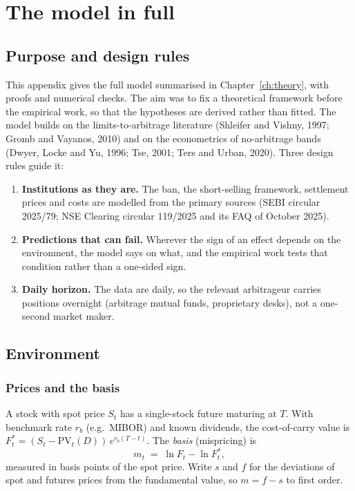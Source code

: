 \chapter{The model in full}\label{app:model}

\section{Purpose and design rules}
This appendix gives the full model summarised in Chapter~\ref{ch:theory}, with proofs and numerical checks. The aim was to
fix a theoretical framework before the empirical work, so that the hypotheses are derived rather than fitted. The model builds on the limits-to-arbitrage literature (Shleifer and Vishny, 1997; Gromb and Vayanos, 2010) and
on the econometrics of no-arbitrage bands (Dwyer, Locke and Yu, 1996; Tse, 2001; Ters and Urban, 2020). Three design
rules guide it:
\begin{enumerate}[leftmargin=1.6em,itemsep=1pt]
\item \textbf{Institutions as they are.} The ban, the short-selling framework, settlement prices and costs are modelled
from the primary sources (SEBI circular 2025/79; NSE Clearing circular 119/2025 and its FAQ of October 2025).
\item \textbf{Predictions that can fail.} Wherever the sign of an effect depends on the environment, the model says on
what, and the empirical work tests that condition rather than a one-sided sign.
\item \textbf{Daily horizon.} The data are daily, so the relevant arbitrageur carries positions overnight
(arbitrage mutual funds, proprietary desks), not a one-second market maker.
\end{enumerate}

\section{Environment}\label{sec:env}
\subsection{Prices and the basis}
A stock with spot price $S_t$ has a single-stock future maturing at $T$. With benchmark rate $r_b$ (e.g.\ MIBOR) and
known dividends, the cost-of-carry value is $F^*_t=(S_t-\mathrm{PV}_t(D))\,e^{r_b(T-t)}$. The \emph{basis} (mispricing)
is
\begin{equation}
m_t \;=\; \ln F_t-\ln F^*_t ,
\end{equation}
measured in basis points of the spot price. Write $s$ and $f$ for the deviations of spot and futures prices from the
fundamental value, so $m=f-s$ to first order.

